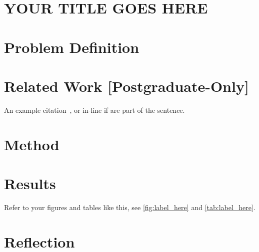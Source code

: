 \documentclass[12pt]{article}
\begin{document}
\section*{YOUR TITLE GOES HERE}

\section{Problem Definition}
\label{sec:problem_definition}

\blindtext[1] %

\section{Related Work [Postgraduate-Only]}
\label{sec:related_work}

An example citation~\cite{mildenhall2020nerf}, or in-line if \citet{mildenhall2020nerf} are part of the sentence.
%
\blindtext[1] %

\section{Method}
\label{sec:method}

\blindtext[1] %

\blindtext[1] %

\blindtext[1] %

\section{Results}
\label{sec:results}

Refer to your figures and tables like this, see \cref{fig:label_here} and \cref{tab:label_here}.
\blindtext[1] %

\blindtext[1] %

\section{Reflection}
\label{sec:reflection}
\end{document}
